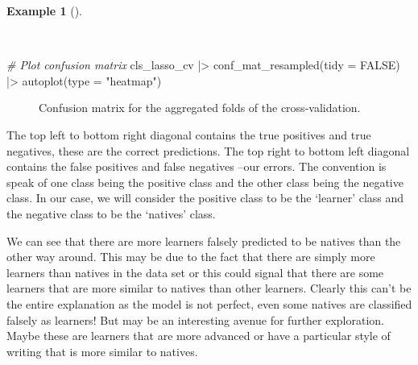 \documentclass[
  letterpaper,
]{latex/krantz}
\newenvironment{Shaded}{\begin{snugshade}}{\end{snugshade}}
\newcommand{\AttributeTok}[1]{\textcolor[rgb]{0.00,0.00,0.00}{#1}}
\newcommand{\CommentTok}[1]{\textcolor[rgb]{0.00,0.00,0.00}{\textit{#1}}}
\newcommand{\ConstantTok}[1]{\textcolor[rgb]{0.00,0.00,0.00}{#1}}
\newcommand{\FunctionTok}[1]{\textcolor[rgb]{0.00,0.00,0.00}{#1}}
\newcommand{\NormalTok}[1]{\textcolor[rgb]{0.00,0.00,0.00}{#1}}
\newcommand{\SpecialCharTok}[1]{\textcolor[rgb]{0.00,0.00,0.00}{#1}}
\newcommand{\StringTok}[1]{\textcolor[rgb]{0.00,0.00,0.00}{#1}}
\theoremstyle{definition}
\newtheorem{example}{Example}[chapter]
\theoremstyle{remark}
\begin{document}
\begin{example}[]\protect\hypertarget{exm-pda-class-tune-hyperparameters-evaluate-workflow-cv-confusion}{}\label{exm-pda-class-tune-hyperparameters-evaluate-workflow-cv-confusion}

~

\begin{Shaded}
\begin{Highlighting}[]
\CommentTok{\# Plot confusion matrix}
\NormalTok{cls\_lasso\_cv }\SpecialCharTok{|\textgreater{}}
  \FunctionTok{conf\_mat\_resampled}\NormalTok{(}\AttributeTok{tidy =} \ConstantTok{FALSE}\NormalTok{) }\SpecialCharTok{|\textgreater{}}
  \FunctionTok{autoplot}\NormalTok{(}\AttributeTok{type =} \StringTok{"heatmap"}\NormalTok{)}
\end{Highlighting}
\end{Shaded}

\begin{figure}[H]


\caption{\label{fig-class-tune-hyperparameters-evaluate-workflow-cv-confusion}Confusion
matrix for the aggregated folds of the cross-validation.}

\end{figure}%

\end{example}

The top left to bottom right diagonal contains the true positives and
true negatives, these are the correct predictions. The top right to
bottom left diagonal contains the false positives and false negatives
--our errors. The convention is speak of one class being the positive
class and the other class being the negative class. In our case, we will
consider the positive class to be the `learner' class and the negative
class to be the `natives' class.

We can see that there are more learners falsely predicted to be natives
than the other way around. This may be due to the fact that there are
simply more learners than natives in the data set or this could signal
that there are some learners that are more similar to natives than other
learners. Clearly this can't be the entire explanation as the model is
not perfect, even some natives are classified falsely as learners! But
may be an interesting avenue for further exploration. Maybe these are
learners that are more advanced or have a particular style of writing
that is more similar to natives.
\end{document}
